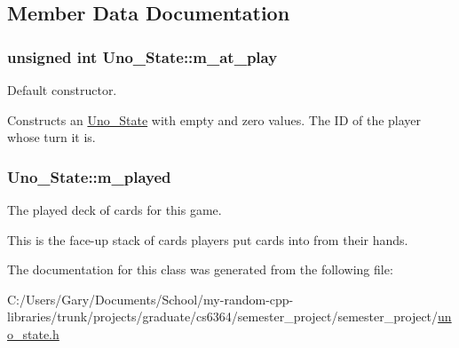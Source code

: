 \subsection{\-Member \-Data \-Documentation}
\hypertarget{class_uno___state_a7c0374eff2c4a4b3eed4b7eebb72a81a}{
\subsubsection[{m\-\_\-at\-\_\-play}]{\setlength{\rightskip}{0pt plus 5cm}unsigned int {\bf \-Uno\-\_\-\-State\-::m\-\_\-at\-\_\-play}}}
\label{class_uno___state_a7c0374eff2c4a4b3eed4b7eebb72a81a}


\-Default constructor. 

\-Constructs an \hyperlink{class_uno___state}{\-Uno\-\_\-\-State} with empty and zero values. \-The \-I\-D of the player whose turn it is. \hypertarget{class_uno___state_ad46fac2ea86f2fd2249675db49c35b6c}{
\subsubsection[{m\-\_\-played}]{ {\bf \-Uno\-\_\-\-State\-::m\-\_\-played}}}
\label{class_uno___state_ad46fac2ea86f2fd2249675db49c35b6c}


\-The played deck of cards for this game. 

\-This is the face-\/up stack of cards players put cards into from their hands. 

\-The documentation for this class was generated from the following file\-:\begin{DoxyCompactItemize}
\item 
\-C\-:/\-Users/\-Gary/\-Documents/\-School/my-\/random-\/cpp-\/libraries/trunk/projects/graduate/cs6364/semester\-\_\-project/semester\-\_\-project/\hyperlink{uno__state_8h}{uno\-\_\-state.\-h}\end{DoxyCompactItemize}
